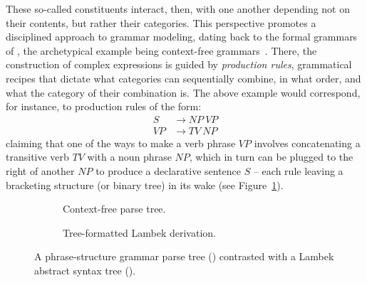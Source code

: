\noindent These so-called constituents interact, then, with one another depending not on their contents, but rather their categories.
This perspective promotes a disciplined approach to grammar modeling, dating back to the formal grammars of \citet{chomsky1956three}, the archetypical example being context-free grammars~\cite{chomsky1956three,jw1959c}.
There, the construction of complex expressions is guided by \textit{production rules}, grammatical recipes that dictate what categories can sequentially combine, in what order, and what the category of their combination is.
The above example would correspond, for instance, to production rules of the form:
\begin{align}
	S 	& 	\to NP \ VP \label{equation:sfromnpvp}\\
	VP 	&	\to TV \ NP \label{equation:vpfromtvnvp}
\end{align}
claiming that one of the ways to make a verb phrase $VP$ involves concatenating a transitive verb $TV$ with a noun phrase $NP$, which in turn can be plugged to the right of another $NP$ to produce a declarative sentence $S$ -- each rule leaving a bracketing structure (or binary tree) in its wake (see Figure~\ref{subfigure:cfgtree}).


\begin{figure}
	\centering
	\hfill%
	\begin{subfigure}[b]{0.35\textwidth}
		\caption{Context-free parse tree.}
		\label{subfigure:cfgtree}
	\end{subfigure}\hfill%
	\begin{subfigure}[b]{0.45\textwidth}
		\caption{Tree-formatted Lambek derivation.}
		\label{subfigure:lambektree}
	\end{subfigure}\hfill
	\caption{A phrase-structure grammar parse tree () contrasted with a Lambek abstract syntax tree ().}
	\label{figure:cfgvslambek}
\end{figure}


